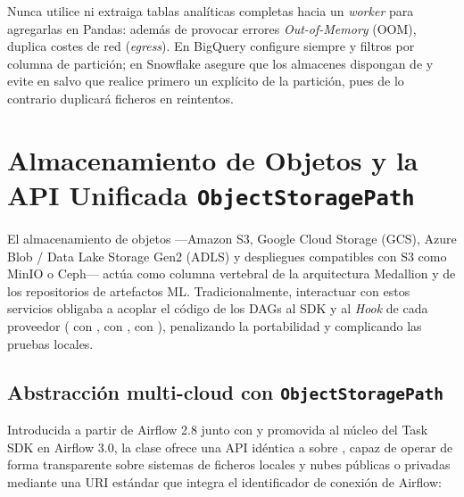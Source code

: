 \begin{warningbox}
Nunca utilice  ni extraiga tablas analíticas completas hacia un \textit{worker} para agregarlas en Pandas: además de provocar errores \textit{Out-of-Memory} (OOM), duplica costes de red (\textit{egress}). En BigQuery configure siempre  y filtros por columna de partición; en Snowflake asegure que los almacenes dispongan de  y evite  en  salvo que realice primero un  explícito de la partición, pues de lo contrario duplicará ficheros en reintentos.
\end{warningbox}

\section{Almacenamiento de Objetos y la API Unificada \texorpdfstring{\texttt{ObjectStoragePath}}{ObjectStoragePath}}\label{sec:conectores-object-storage}

El almacenamiento de objetos ---Amazon S3, Google Cloud Storage (GCS), Azure Blob / Data Lake Storage Gen2 (ADLS) y despliegues compatibles con S3 como MinIO o Ceph--- actúa como columna vertebral de la arquitectura Medallion y de los repositorios de artefactos ML. Tradicionalmente, interactuar con estos servicios obligaba a acoplar el código de los DAGs al SDK y al \textit{Hook} de cada proveedor ( con ,  con ,  con ), penalizando la portabilidad y complicando las pruebas locales.

\subsection{Abstracción multi-cloud con \texttt{ObjectStoragePath}}

Introducida a partir de Airflow 2.8 junto con  y promovida al núcleo del Task SDK en Airflow 3.0, la clase  ofrece una API idéntica a  sobre , capaz de operar de forma transparente sobre sistemas de ficheros locales y nubes públicas o privadas mediante una URI estándar que integra el identificador de conexión de Airflow:

